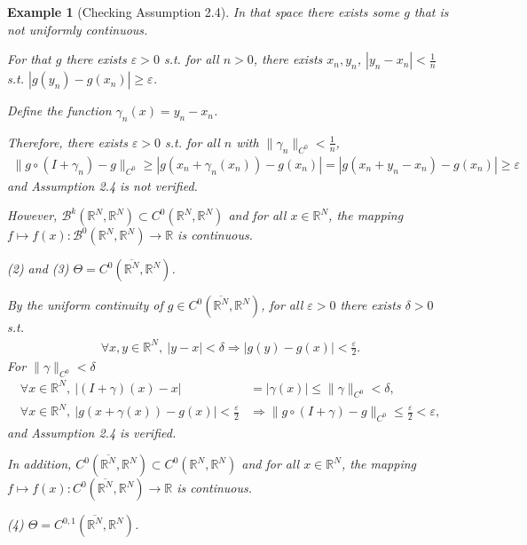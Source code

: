 \documentclass{book}
\numberwithin{equation}{section}
\newtheorem{example}{Example}[section]
\begin{document}
\begin{enumerate}
\begin{example}[Checking Assumption 2.4]
        In that space there exists some $g$ that is not uniformly continuous.
        
        For that $g$ there exists $\varepsilon > 0$ s.t. for all $n > 0$, there exists $x_n,y_n$, $|y_n - x_n| < \frac{1}{n}$ s.t. $|g(y_n) - g(x_n)|\ge\varepsilon$.
        
        Define the function $\gamma_n(x) = y_n - x_n$.
        
        Therefore, there exists $\varepsilon > 0$ s.t. for all $n$ with $\|\gamma_n\|_{C^0} < \frac{1}{n}$,
        \begin{align*}
            \|g\circ(I + \gamma_n) - g\|_{C^0}\ge|g(x_n + \gamma_n(x_n)) - g(x_n)| = |g(x_n + y_n - x_n) - g(x_n)|\ge\varepsilon
        \end{align*}
        and Assumption 2.4 is not verified.
        
        However, $\mathcal{B}^k(\mathbb{R}^N,\mathbb{R}^N)\subset C^0(\mathbb{R}^N,\mathbb{R}^N)$ and for all $x\in\mathbb{R}^N$, the mapping $f\mapsto f(x):\mathcal{B}^0(\mathbb{R}^N,\mathbb{R}^N)\to\mathbb{R}$ is continuous.
        
        (2) and (3) $\Theta = C^0(\overline{\mathbb{R}^N},\mathbb{R}^N)$.
        
        By the uniform continuity of $g\in C^0(\overline{\mathbb{R}^N},\mathbb{R}^N)$, for all $\varepsilon > 0$ there exists $\delta > 0$ s.t.
        \begin{align*}
            \forall x,y\in\mathbb{R}^N,\ |y - x| < \delta\Rightarrow|g(y) - g(x)| < \frac{\varepsilon}{2}.
        \end{align*}
        For $\|\gamma\|_{C^0} < \delta$
        \begin{align*}
            \forall x\in\mathbb{R}^N,\ |(I + \gamma)(x) - x| &= |\gamma(x)|\le\|\gamma\|_{C^0} < \delta,\\
            \forall x\in\mathbb{R}^N,\ |g(x + \gamma(x)) - g(x)| < \frac{\varepsilon}{2}&\Rightarrow\|g\circ(I + \gamma) - g\|_{C^0}\le\frac{\varepsilon}{2} < \varepsilon,
        \end{align*}
        and Assumption 2.4 is verified.
        
        In addition, $C^0(\overline{\mathbb{R}^N},\mathbb{R}^N)\subset C^0(\mathbb{R}^N,\mathbb{R}^N)$ and for all $x\in\mathbb{R}^N$, the mapping $f\mapsto f(x): C^0(\overline{\mathbb{R}^N},\mathbb{R}^N)\to\mathbb{R}$ is continuous.
        
        (4) $\Theta = C^{0,1}(\overline{\mathbb{R}^N},\mathbb{R}^N)$.
        

\end{example}
\end{enumerate}
\end{document}
